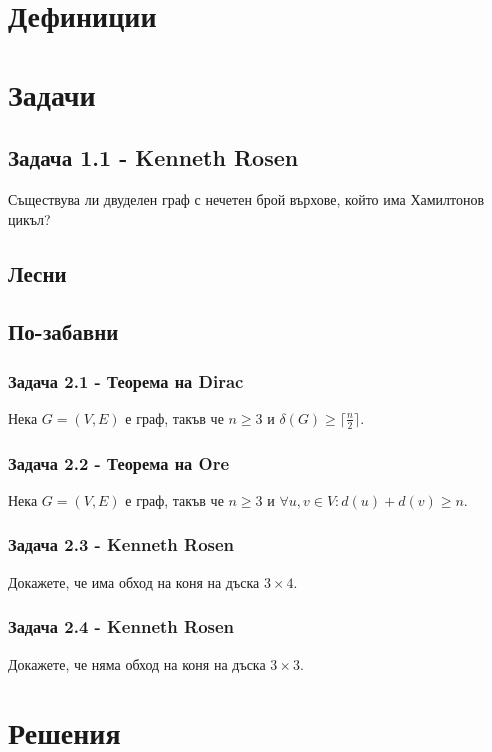 \documentclass[12pt]{article}
\begin{document}
\section*{Дефиниции}

\section*{Задачи}
\subsection*{Задача 1.1 - Kenneth Rosen}
Съществува ли двуделен граф с нечетен брой върхове, който има Хамилтонов цикъл?

\subsection*{Лесни}

\subsection*{По-забавни}
\subsubsection*{Задача 2.1 - Теорема на Dirac}
Нека $G = (V, E)$ е граф, такъв че $n \geq 3$ и $\delta(G) \geq \lceil \frac{n}{2} \rceil$.
\subsubsection*{Задача 2.2 - Теорема на Ore}
Нека $G = (V, E)$ е граф, такъв че $n \geq 3$ и $\forall u, v \in V: d(u) + d(v) \geq n$.
\subsubsection*{Задача 2.3 - Kenneth Rosen}
Докажете, че има обход на коня на дъска $3 \times 4$.
\subsubsection*{Задача 2.4 - Kenneth Rosen}
Докажете, че няма обход на коня на дъска $3 \times 3$.

\section*{Решения}
\end{document}
